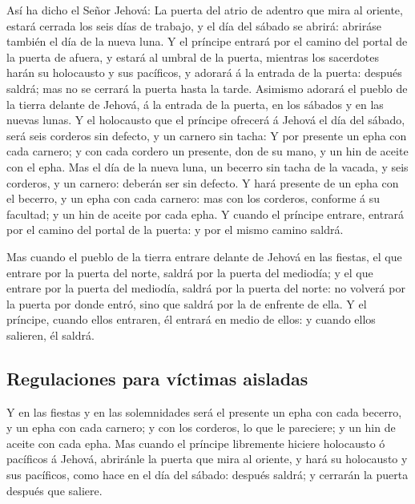 Así ha dicho el Señor Jehová: La puerta del atrio de
adentro que mira al oriente, estará cerrada los seis días de trabajo, y
el día del sábado se abrirá: abriráse también el día de la nueva luna.
 Y el príncipe entrará por el camino del portal de la puerta
de afuera, y estará al umbral de la puerta, mientras los sacerdotes
harán su holocausto y sus pacíficos, y adorará á la entrada de la
puerta: después saldrá; mas no se cerrará la puerta hasta la tarde.
 Asimismo adorará el pueblo de la tierra delante de Jehová,
á la entrada de la puerta, en los sábados y en las nuevas lunas.
 Y el holocausto que el príncipe ofrecerá á Jehová el día
del sábado, será seis corderos sin defecto, y un carnero sin tacha:
 Y por presente un epha con cada carnero; y con cada cordero
un presente, don de su mano, y un hin de aceite con el epha.
 Mas el día de la nueva luna, un becerro sin tacha de la
vacada, y seis corderos, y un carnero: deberán ser sin defecto.
 Y hará presente de un epha con el becerro, y un epha con
cada carnero: mas con los corderos, conforme á su facultad; y un hin de
aceite por cada epha.  Y cuando el príncipe entrare, entrará
por el camino del portal de la puerta: y por el mismo camino saldrá.

 Mas cuando el pueblo de la tierra entrare delante de Jehová
en las fiestas, el que entrare por la puerta del norte, saldrá por la
puerta del mediodía; y el que entrare por la puerta del mediodía, saldrá
por la puerta del norte: no volverá por la puerta por donde entró, sino
que saldrá por la de enfrente de ella.  Y el príncipe,
cuando ellos entraren, él entrará en medio de ellos: y cuando ellos
salieren, él saldrá.

\hypertarget{regulaciones-para-vuxedctimas-aisladas}{%
\subsection{Regulaciones para víctimas
aisladas}\label{regulaciones-para-vuxedctimas-aisladas}}

 Y en las fiestas y en las solemnidades será el presente un
epha con cada becerro, y un epha con cada carnero; y con los corderos,
lo que le pareciere; y un hin de aceite con cada epha.  Mas
cuando el príncipe libremente hiciere holocausto ó pacíficos á Jehová,
abriránle la puerta que mira al oriente, y hará su holocausto y sus
pacíficos, como hace en el día del sábado: después saldrá; y cerrarán la
puerta después que saliere.

